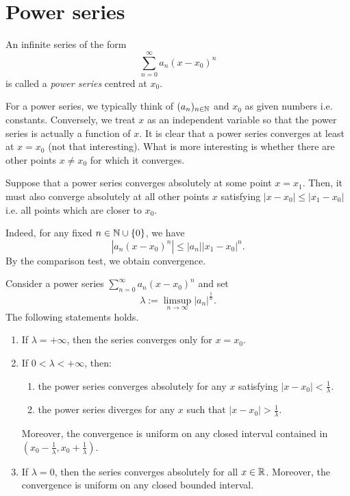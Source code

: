 \section{Power series}
\label{sec:power_series}
\begin{defn}
	\label{defn:power_series}
	An infinite series of the form
	\[
	\sum_{n=0}^\infty a_n (x-x_0)^n
	\]
	is called a \textit{power series} centred at $x_0$.
\end{defn}
For a power series, we typically think of $(a_n)_{n\in\mathbb{N}}$ and $x_0$ as given numbers i.e. constants. Conversely, we treat $x$ as an independent variable so that the power series is actually a function of $x$. It is clear that a power series converges at least at $x=x_0$ (not that interesting). What is more interesting is whether there are other points $x\neq x_0$ for which it converges.
\begin{rem}
	Suppose that a power series converges absolutely at some point $x=x_1$. Then, it must also converge absolutely at all other points $x$ satisfying $|x-x_0|\le |x_1-x_0|$ i.e. all points which are closer to $x_0$.
	
	Indeed, for any fixed $n\in \mathbb{N}\cup\{0\}$, we have
	\[
	|a_n(x-x_0)^n| \le |a_n||x_1-x_0|^n.
	\]
	By the comparison test, we obtain convergence.
\end{rem}
\begin{thm}
	\label{thm:cvg_power}
	Consider a power series $\sum_{n=0}^\infty a_n(x-x_0)^n$ and set
	\[
	\lambda:= \limsup_{n\to \infty}|a_n|^\frac{1}{n}.
	\]
	The following statements holds.
	\begin{enumerate}
		\item If $\lambda = +\infty$, then the series converges only for $x=x_0$.
		\item If $0<\lambda < +\infty$, then:
		\begin{enumerate}
			\item the power series converges absolutely for any $x$ satisfying $|x-x_0|< \frac{1}{\lambda}$.
			\item the power series diverges for any $x$ such that $|x-x_0|>\frac{1}{\lambda}$.
		\end{enumerate}
		Moreover, the convergence is uniform on any closed interval contained in $\left(x_0 - \frac{1}{\lambda},x_0 + \frac{1}{\lambda}\right)$.
		\item If $\lambda = 0$, then the series converges absolutely for all $x\in\mathbb{R}$. Moreover, the convergence is uniform on any closed bounded interval.
	\end{enumerate}
\end{thm}
